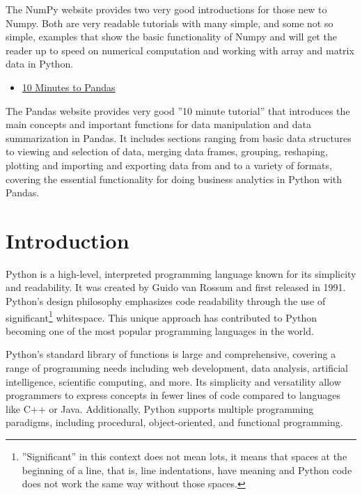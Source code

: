 The NumPy website provides two very good introductions for those new to Numpy. Both are very readable tutorials with many simple, and some not so simple, examples that show the basic functionality of Numpy and will get the reader up to speed on numerical computation and working with array and matrix data in Python.

\begin{resourcebox}
\begin{itemize}
\item \href{http://pandas.pydata.org/docs/user_guide/10min.html}{10 Minutes to Pandas}\\
\end{itemize}
\end{resourcebox}

The Pandas website provides very good ''10 minute tutorial'' that introduces the main concepts and important functions for data manipulation and data summarization in Pandas. It includes sections ranging from basic data structures to viewing and selection of data, merging data frames, grouping, reshaping, plotting and importing and exporting data from and to a variety of formats, covering the essential functionality for doing business analytics in Python with Pandas.


\section{Introduction}

Python is a high-level, interpreted programming language known for its simplicity and readability. It was created by Guido van Rossum and first released in 1991. Python's design philosophy emphasizes code readability through the use of significant\footnote{''Significant'' in this context does not mean lots, it means that spaces at the beginning of a line, that is, line indentations, have meaning and Python code does not work the same way without those spaces.} whitespace. This unique approach has contributed to Python becoming one of the most popular programming languages in the world.

Python's standard library of functions is large and comprehensive, covering a range of programming needs including web development, data analysis, artificial intelligence, scientific computing, and more. Its simplicity and versatility allow programmers to express concepts in fewer lines of code compared to languages like C++ or Java. Additionally, Python supports multiple programming paradigms, including procedural, object-oriented, and functional programming.

